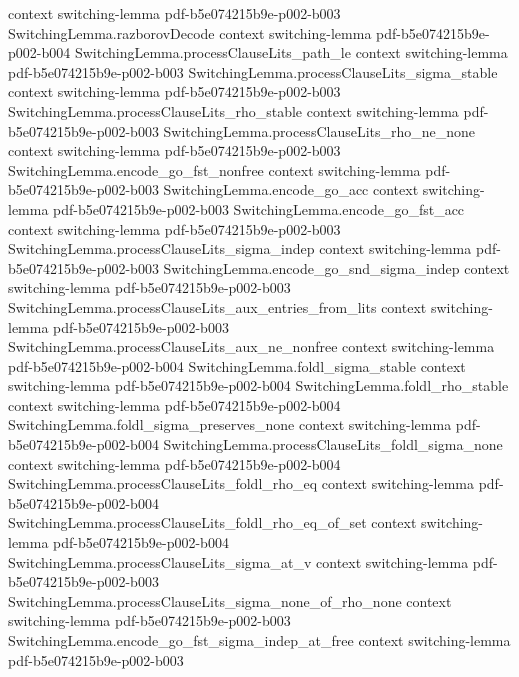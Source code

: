 \begin{lemma}
  {context}
  {switching-lemma}
  {pdf-b5e074215b9e-p002-b003}
\proofstep
  {SwitchingLemma.razborovDecode}
  {context}
  {switching-lemma}
  {pdf-b5e074215b9e-p002-b004}
\proofstep
  {SwitchingLemma.processClauseLits_path_le}
  {context}
  {switching-lemma}
  {pdf-b5e074215b9e-p002-b003}
\proofstep
  {SwitchingLemma.processClauseLits_sigma_stable}
  {context}
  {switching-lemma}
  {pdf-b5e074215b9e-p002-b003}
\proofstep
  {SwitchingLemma.processClauseLits_rho_stable}
  {context}
  {switching-lemma}
  {pdf-b5e074215b9e-p002-b003}
\proofstep
  {SwitchingLemma.processClauseLits_rho_ne_none}
  {context}
  {switching-lemma}
  {pdf-b5e074215b9e-p002-b003}
\proofstep
  {SwitchingLemma.encode_go_fst_nonfree}
  {context}
  {switching-lemma}
  {pdf-b5e074215b9e-p002-b003}
\proofstep
  {SwitchingLemma.encode_go_acc}
  {context}
  {switching-lemma}
  {pdf-b5e074215b9e-p002-b003}
\proofstep
  {SwitchingLemma.encode_go_fst_acc}
  {context}
  {switching-lemma}
  {pdf-b5e074215b9e-p002-b003}
\proofstep
  {SwitchingLemma.processClauseLits_sigma_indep}
  {context}
  {switching-lemma}
  {pdf-b5e074215b9e-p002-b003}
\proofstep
  {SwitchingLemma.encode_go_snd_sigma_indep}
  {context}
  {switching-lemma}
  {pdf-b5e074215b9e-p002-b003}
\proofstep
  {SwitchingLemma.processClauseLits_aux_entries_from_lits}
  {context}
  {switching-lemma}
  {pdf-b5e074215b9e-p002-b003}
\proofstep
  {SwitchingLemma.processClauseLits_aux_ne_nonfree}
  {context}
  {switching-lemma}
  {pdf-b5e074215b9e-p002-b004}
\proofstep
  {SwitchingLemma.foldl_sigma_stable}
  {context}
  {switching-lemma}
  {pdf-b5e074215b9e-p002-b004}
\proofstep
  {SwitchingLemma.foldl_rho_stable}
  {context}
  {switching-lemma}
  {pdf-b5e074215b9e-p002-b004}
\proofstep
  {SwitchingLemma.foldl_sigma_preserves_none}
  {context}
  {switching-lemma}
  {pdf-b5e074215b9e-p002-b004}
\proofstep
  {SwitchingLemma.processClauseLits_foldl_sigma_none}
  {context}
  {switching-lemma}
  {pdf-b5e074215b9e-p002-b004}
\proofstep
  {SwitchingLemma.processClauseLits_foldl_rho_eq}
  {context}
  {switching-lemma}
  {pdf-b5e074215b9e-p002-b004}
\proofstep
  {SwitchingLemma.processClauseLits_foldl_rho_eq_of_set}
  {context}
  {switching-lemma}
  {pdf-b5e074215b9e-p002-b004}
\proofstep
  {SwitchingLemma.processClauseLits_sigma_at_v}
  {context}
  {switching-lemma}
  {pdf-b5e074215b9e-p002-b003}
\proofstep
  {SwitchingLemma.processClauseLits_sigma_none_of_rho_none}
  {context}
  {switching-lemma}
  {pdf-b5e074215b9e-p002-b003}
\proofstep
  {SwitchingLemma.encode_go_fst_sigma_indep_at_free}
  {context}
  {switching-lemma}
  {pdf-b5e074215b9e-p002-b003}

\end{lemma}

